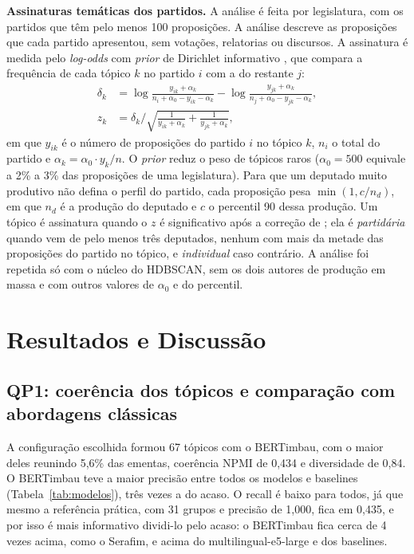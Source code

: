 \documentclass[12pt]{article}
\begin{document}
\textbf{Assinaturas temáticas dos partidos.}\label{subsec:rq2} A análise é feita por legislatura, com os partidos que têm pelo menos 100 proposições. A análise descreve as proposições que cada partido apresentou, sem votações, relatorias ou discursos. A assinatura é medida pelo \textit{log-odds} com \textit{prior} de Dirichlet informativo \citep{monroe2008fightin}, que compara a frequência de cada tópico $k$ no partido $i$ com a do restante $j$:
\begin{align}
\delta_k &= \log\frac{y_{ik} + \alpha_k}{n_i + \alpha_0 - y_{ik} - \alpha_k} - \log\frac{y_{jk} + \alpha_k}{n_j + \alpha_0 - y_{jk} - \alpha_k}, \\
z_k &= \delta_k \bigg/ \sqrt{\frac{1}{y_{ik} + \alpha_k} + \frac{1}{y_{jk} + \alpha_k}},
\end{align}
em que $y_{ik}$ é o número de proposições do partido $i$ no tópico $k$, $n_i$ o total do partido e $\alpha_k = \alpha_0 \cdot y_k / n$. O \textit{prior} reduz o peso de tópicos raros ($\alpha_0 = 500$ equivale a 2\% a 3\% das proposições de uma legislatura). Para que um deputado muito produtivo não defina o perfil do partido, cada proposição pesa $\min(1, c/n_d)$, em que $n_d$ é a produção do deputado e $c$ o percentil 90 dessa produção. Um tópico é assinatura quando o $z$ é significativo após a correção de \citet{benjamini1995controlling}; ela é \textit{partidária} quando vem de pelo menos três deputados, nenhum com mais da metade das proposições do partido no tópico, e \textit{individual} caso contrário. A análise foi repetida só com o núcleo do HDBSCAN, sem os dois autores de produção em massa e com outros valores de $\alpha_0$ e do percentil.

\section{Resultados e Discussão}
\label{sec:resultados}

\subsection{QP1: coerência dos tópicos e comparação com abordagens clássicas}
\label{subsec:res-qp1}

A configuração escolhida formou 67 tópicos com o BERTimbau, com o maior deles reunindo 5,6\% das ementas, coerência NPMI de 0,434 e diversidade de 0,84. O BERTimbau teve a maior precisão entre todos os modelos e baselines (Tabela~\ref{tab:modelos}), três vezes a do acaso. O recall é baixo para todos, já que mesmo a referência prática, com 31 grupos e precisão de 1,000, fica em 0,435, e por isso é mais informativo dividi-lo pelo acaso: o BERTimbau fica cerca de 4 vezes acima, como o Serafim, e acima do multilingual-e5-large e dos baselines.
\end{document}
